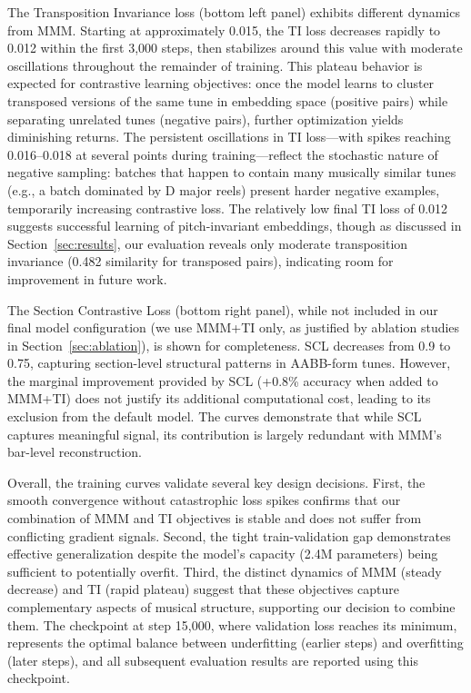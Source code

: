 \documentclass[]{interact}
\theoremstyle{plain}
\theoremstyle{definition}
\theoremstyle{remark}
\begin{document}
The Transposition Invariance loss (bottom left panel) exhibits different dynamics from MMM. Starting at approximately 0.015, the TI loss decreases rapidly to 0.012 within the first 3,000 steps, then stabilizes around this value with moderate oscillations throughout the remainder of training. This plateau behavior is expected for contrastive learning objectives: once the model learns to cluster transposed versions of the same tune in embedding space (positive pairs) while separating unrelated tunes (negative pairs), further optimization yields diminishing returns. The persistent oscillations in TI loss---with spikes reaching 0.016--0.018 at several points during training---reflect the stochastic nature of negative sampling: batches that happen to contain many musically similar tunes (e.g., a batch dominated by D major reels) present harder negative examples, temporarily increasing contrastive loss. The relatively low final TI loss of 0.012 suggests successful learning of pitch-invariant embeddings, though as discussed in Section~\ref{sec:results}, our evaluation reveals only moderate transposition invariance (0.482 similarity for transposed pairs), indicating room for improvement in future work.

The Section Contrastive Loss (bottom right panel), while not included in our final model configuration (we use MMM+TI only, as justified by ablation studies in Section~\ref{sec:ablation}), is shown for completeness. SCL decreases from 0.9 to 0.75, capturing section-level structural patterns in AABB-form tunes. However, the marginal improvement provided by SCL (+0.8\% accuracy when added to MMM+TI) does not justify its additional computational cost, leading to its exclusion from the default model. The curves demonstrate that while SCL captures meaningful signal, its contribution is largely redundant with MMM's bar-level reconstruction.

Overall, the training curves validate several key design decisions. First, the smooth convergence without catastrophic loss spikes confirms that our combination of MMM and TI objectives is stable and does not suffer from conflicting gradient signals. Second, the tight train-validation gap demonstrates effective generalization despite the model's capacity (2.4M parameters) being sufficient to potentially overfit. Third, the distinct dynamics of MMM (steady decrease) and TI (rapid plateau) suggest that these objectives capture complementary aspects of musical structure, supporting our decision to combine them. The checkpoint at step 15,000, where validation loss reaches its minimum, represents the optimal balance between underfitting (earlier steps) and overfitting (later steps), and all subsequent evaluation results are reported using this checkpoint.
\end{document}
